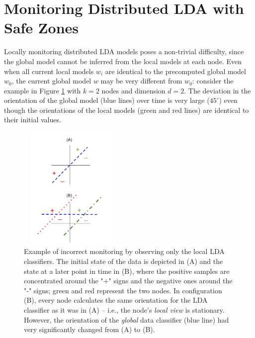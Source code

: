 

\section{Monitoring Distributed LDA with Safe Zones}
Locally monitoring distributed LDA models poses a non-trivial difficulty, since the global model cannot be inferred from the local models at each node. Even when all current local models $w_i$ are identical to the precomputed global model $w_0$, the current global model $w$ may be very different from  $w_0$: consider the example in Figure \ref{NegativeExample} with $k = 2$ nodes and dimension $d =2$. The deviation
in the orientation of the global model (blue lines) over time is very large ($45^{\circ}$) even though the orientations of the local models (green and red lines) are identical to their
initial values.

\begin{figure}[H]
\centering
\includegraphics[width=50mm, height=6cm]{graphics/NegativeExample.png}
\caption{Example of incorrect monitoring by observing only the local LDA classifiers. The
initial state of the data is depicted in (A) and the state at a later point
in time
in (B), where the positive samples are concentrated around the "+" signs and
the negative ones around the "-" signs; green and red represent the two nodes.
In configuration (B), every node  calculates the same orientation
for the LDA classifier as it was in (A) -- i.e., the node's \emph{local view} is
stationary. However, the orientation of the \emph{global} data classifier (blue line) had very
significantly changed from (A) to (B).}
\label{NegativeExample}
\end{figure}


